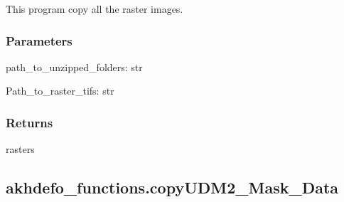 \documentclass[letterpaper,10pt]{sphinxmanual}
\begin{document}
\begin{fulllineitems}
\label{\detokenize{generated/akhdefo_functions.copyImage_Data:akhdefo_functions.copyImage_Data}}
\pysigstartsignatures
{}
\pysigstopsignatures
\sphinxAtStartPar
This program copy all the raster images.


\subsubsection{Parameters}
\label{\detokenize{generated/akhdefo_functions.copyImage_Data:parameters}}
\sphinxAtStartPar
path\_to\_unzipped\_folders: str

\sphinxAtStartPar
Path\_to\_raster\_tifs: str


\subsubsection{Returns}
\label{\detokenize{generated/akhdefo_functions.copyImage_Data:returns}}
\sphinxAtStartPar
rasters

\end{fulllineitems}


\sphinxstepscope


\subsection{akhdefo\_functions.copyUDM2\_Mask\_Data}
\label{\detokenize{generated/akhdefo_functions.copyUDM2_Mask_Data:akhdefo-functions-copyudm2-mask-data}}\label{\detokenize{generated/akhdefo_functions.copyUDM2_Mask_Data::doc}}
\end{document}
